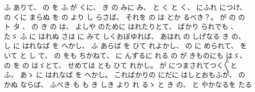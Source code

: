 ふ
ありて、
%
の
を
ふ
が
くに、
%
き
の
みに
み、
%
と
く
と
く、
%
にふれ
につけ、
%
の
くに
まらぬ
を
の
より
し
らさば、
%
それを
の
は
とか
るべき？。
%
が
の
の
ト
タ
、
%
の
き
の
は、
%
よしや
のために
はれたりとて、
%
ばかり
られでも
、
%
たゞ
ふ
に
はれぬ
さは
に
みて
しくおぼゆれば、
%
あはれ
の
しげなる
き
の、
%
し
に
はれなば
を
へかし、
%
ふ
あらば
を
ひて
れよかし、
%
の
に
められて、
%
を
いて
と
し
て、
%
の
をも
ちかねて、
%
に
んずるに
れる
の
が
きものにも
はゞ、
%
の
を
の
はゞとて、
%
せめては
とも
ひて
れかし。
%
が
につまされてつく〴〵と
ふ、
%
あゝ
に
はれなば
を
へかし。
%
こればかりの
にだに
はしとおもふが、
%
の
かぬ
ならば、
%
ふべき
も
も
き
しき
より
れ
るゝ
と
き
の、
%
と
やかなるを
たる
